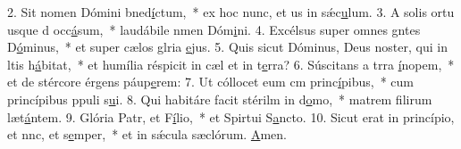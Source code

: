 2. Sit nomen Dómini bned\uline{í}ctum,~* ex hoc nunc, et us in sǽc\uline{u}lum.
3. A solis ortu usque d occ\uline{á}sum,~* laudábile nmen Dóm\uline{i}ni.
4. Excélsus super omnes gntes D\uline{ó}minus,~* et super cælos glria \uline{e}jus.
5. Quis sicut Dóminus, Deus noster, qui in ltis h\uline{á}bitat,~* et humília réspicit in cæl et in t\uline{e}rra?
6. Súscitans a trra \uline{í}nopem,~* et de stércore érgens páup\uline{e}rem:
7. Ut cóllocet eum cm princ\uline{í}pibus,~* cum princípibus ppuli s\uline{u}i.
8. Qui habitáre facit stérilm in d\uline{o}mo,~* matrem filirum læt\uline{á}ntem.
9. Glória Patr, et F\uline{í}lio,~* et Spirtui S\uline{a}ncto.
10. Sicut erat in princípio, et nnc, et s\uline{e}mper,~* et in sǽcula sæclórum. \uline{A}men.
